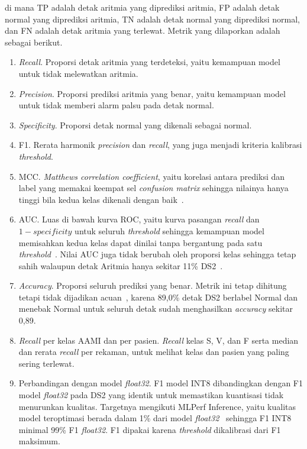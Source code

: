 \noindent di mana TP adalah detak aritmia yang diprediksi aritmia, FP adalah detak normal yang diprediksi aritmia, TN adalah detak normal yang diprediksi normal, dan FN adalah detak aritmia yang terlewat. Metrik yang dilaporkan adalah sebagai berikut.
\begin{enumerate}[label=\arabic*)]
  \item \textit{Recall}. Proporsi detak aritmia yang terdeteksi, yaitu kemampuan model untuk tidak melewatkan aritmia.
  \item \textit{Precision}. Proporsi prediksi aritmia yang benar, yaitu kemampuan model untuk tidak memberi alarm palsu pada detak normal.
  \item \textit{Specificity}. Proporsi detak normal yang dikenali sebagai normal.
  \item F1. Rerata harmonik \textit{precision} dan \textit{recall}, yang juga menjadi kriteria kalibrasi \textit{threshold}.
  \item MCC. \textit{Matthews correlation coefficient}, yaitu korelasi antara prediksi dan label yang memakai keempat sel \textit{confusion matrix} sehingga nilainya hanya tinggi bila kedua kelas dikenali dengan baik~\cite{chicco_2020}.
  \item AUC. Luas di bawah kurva ROC, yaitu kurva pasangan \textit{recall} dan $1 - \textit{specificity}$ untuk seluruh \textit{threshold} sehingga kemampuan model memisahkan kedua kelas dapat dinilai tanpa bergantung pada satu \textit{threshold}~\cite{chicco_2020}. Nilai AUC juga tidak berubah oleh proporsi kelas sehingga tetap sahih walaupun detak Aritmia hanya sekitar 11\% DS2~\cite{richardson_2024}.
  \item \textit{Accuracy}. Proporsi seluruh prediksi yang benar. Metrik ini tetap dihitung tetapi tidak dijadikan acuan~\cite{chicco_2020}, karena 89,0\% detak DS2 berlabel Normal dan menebak Normal untuk seluruh detak sudah menghasilkan \textit{accuracy} sekitar 0,89.
  \item \textit{Recall} per kelas AAMI dan per pasien. \textit{Recall} kelas S, V, dan F serta median dan rerata \textit{recall} per rekaman, untuk melihat kelas dan pasien yang paling sering terlewat.
  \item Perbandingan dengan model \textit{float32}. F1 model INT8 dibandingkan dengan F1 model \textit{float32} pada DS2 yang identik untuk memastikan kuantisasi tidak menurunkan kualitas. Targetnya mengikuti MLPerf Inference, yaitu kualitas model teroptimasi berada dalam 1\% dari model \textit{float32}~\cite{reddi_2020} sehingga F1 INT8 minimal 99\% F1 \textit{float32}. F1 dipakai karena \textit{threshold} dikalibrasi dari F1 maksimum.
\end{enumerate}

